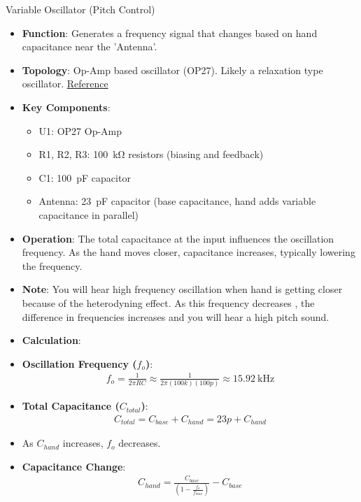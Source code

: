 \documentclass[10pt,xcolor={table,dvipsnames},t]{beamer}
\begin{document}
\begin{frame}{Variable Oscillator (Pitch Control)}
\begin{itemize}
    \item \textbf{Function}: Generates a frequency signal that changes based on hand capacitance near the 'Antenna'.
    \item \textbf{Topology}: Op-Amp based oscillator (OP27). Likely a relaxation type oscillator. \href{https://circuitdigest.com/tutorial/relaxation-oscillator-using-op-amp}{Reference}
      \item \textbf{Key Components}:
    \begin{itemize}
        \item U1: OP27 Op-Amp
        \item R1, R2, R3: \SI{100}{\kilo\ohm} resistors (biasing and feedback)
        \item C1: \SI{100}{\pico\farad} capacitor
        \item Antenna: \SI{23}{\pico\farad} capacitor (base capacitance, hand adds variable capacitance in parallel)
    \end{itemize}
    \item \textbf{Operation}: The total capacitance at the input influences the oscillation frequency. As the hand moves closer, capacitance increases, typically lowering the frequency.  
    \item \textbf{Note}: You will hear high frequency oscillation when hand is getting closer because of the heterodyning effect. As this frequency decreases , the difference in frequencies increases and you will hear a high pitch sound.
    \item \textbf{Calculation}:
\end{itemize}
\end{frame}

\begin{itemize}
    \item \textbf{Oscillation Frequency ($f_o$)}:
    \begin{align*}
    f_o = \frac{1}{2\pi R C} \approx \frac{1}{2\pi (100k)(100p)} \approx \SI{15.92}{\kilo\hertz}
    \end{align*}
    \item \textbf{Total Capacitance ($C_{total}$)}:
    \begin{align*}
    C_{total} = C_{base} + C_{hand} = 23p + C_{hand}
    \end{align*}
    \item As $C_{hand}$ increases, $f_o$ decreases.
    \item \textbf{Capacitance Change}:
    \begin{align*}
    C_{hand} = \frac{C_{base}}{(1 - \frac{f_o}{f_{max}})} - C_{base}
    \end{align*}
\end{itemize}
\end{document}

